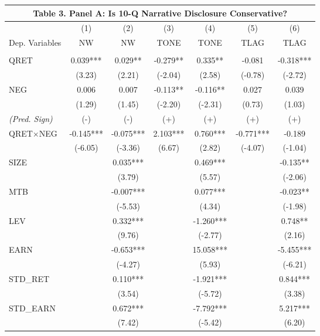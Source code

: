 \begin{table}[H] \label{T3PA}
	\begin{center}
		\begin{tabular}{lcccccc}
			\multicolumn{7}{c}{\textbf{Table 3. Panel A: Is 10-Q Narrative Disclosure Conservative?}} \\
			\toprule
			\toprule
			& (1) & (2) & (3) & (4) & (5) & (6) \\
			Dep. Variables & NW & NW & TONE & TONE & TLAG & TLAG \\
			\midrule
			&   &   &   &   &   &  \\
			QRET & 0.039*** & 0.029** & -0.279** & 0.335** & -0.081 & -0.318*** \\
			& (3.23) & (2.21) & (-2.04) & (2.58) & (-0.78) & (-2.72) \\
			NEG & 0.006 & 0.007 & -0.113** & -0.116** & 0.027 & 0.039 \\
			& (1.29) & (1.45) & (-2.20) & (-2.31) & (0.73) & (1.03) \\
			\rowcolor[rgb]{ .933,  .925,  .882} \textit{(Pred. Sign)} & (-) & (-) & (+) & (+) & (+) & (+) \\
			\rowcolor[rgb]{ .933,  .925,  .882} QRET$\times$NEG & -0.145*** & -0.075*** & 2.103*** & 0.760*** & -0.771*** & -0.189 \\
			\rowcolor[rgb]{ .933,  .925,  .882}   & (-6.05) & (-3.36) & (6.67) & (2.82) & (-4.07) & (-1.04) \\
			SIZE &   & 0.035*** &   & 0.469*** &   & -0.135** \\
			&   & (3.79) &   & (5.57) &   & (-2.06) \\
			MTB &   & -0.007*** &   & 0.077*** &   & -0.023** \\
			&   & (-5.53) &   & (4.34) &   & (-1.98) \\
			LEV &   & 0.332*** &   & -1.260*** &   & 0.748** \\
			&   & (9.76) &   & (-2.77) &   & (2.16) \\
			EARN &   & -0.653*** &   & 15.058*** &   & -5.455*** \\
			&   & (-4.27) &   & (5.93) &   & (-6.21) \\
			STD\_RET &   & 0.110*** &   & -1.921*** &   & 0.844*** \\
			&   & (3.54) &   & (-5.72) &   & (3.38) \\
			STD\_EARN &   & 0.672*** &   & -7.792*** &   & 5.217*** \\
			&   & (7.42) &   & (-5.42) &   & (6.20) \\

\end{tabular}
\end{center}
\end{table}
